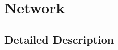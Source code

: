 \hypertarget{group__network}{}\section{Network}
\label{group__network}


\subsection{Detailed Description}

